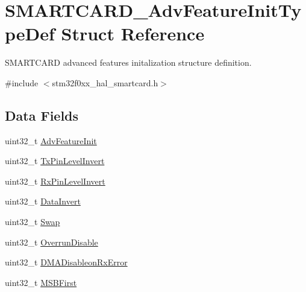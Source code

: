 \hypertarget{struct_s_m_a_r_t_c_a_r_d___adv_feature_init_type_def}{}\section{S\+M\+A\+R\+T\+C\+A\+R\+D\+\_\+\+Adv\+Feature\+Init\+Type\+Def Struct Reference}
\label{struct_s_m_a_r_t_c_a_r_d___adv_feature_init_type_def}


S\+M\+A\+R\+T\+C\+A\+RD advanced features initalization structure definition.  




{\ttfamily \#include $<$stm32f0xx\+\_\+hal\+\_\+smartcard.\+h$>$}

\subsection*{Data Fields}
\begin{DoxyCompactItemize}
\item 
uint32\+\_\+t \hyperlink{struct_s_m_a_r_t_c_a_r_d___adv_feature_init_type_def_ad3ebc9a49be4aa143250abfbe6c427d1}{Adv\+Feature\+Init}
\item 
uint32\+\_\+t \hyperlink{struct_s_m_a_r_t_c_a_r_d___adv_feature_init_type_def_a60e165495975a7d568a8ffad4e8d8d82}{Tx\+Pin\+Level\+Invert}
\item 
uint32\+\_\+t \hyperlink{struct_s_m_a_r_t_c_a_r_d___adv_feature_init_type_def_aac4de1a4e7a0036f074a66c3bdc81322}{Rx\+Pin\+Level\+Invert}
\item 
uint32\+\_\+t \hyperlink{struct_s_m_a_r_t_c_a_r_d___adv_feature_init_type_def_a1feb1398f541e95a819aea3aed2d7552}{Data\+Invert}
\item 
uint32\+\_\+t \hyperlink{struct_s_m_a_r_t_c_a_r_d___adv_feature_init_type_def_ac584fd738a8eca4af2f92cd10d593ab0}{Swap}
\item 
uint32\+\_\+t \hyperlink{struct_s_m_a_r_t_c_a_r_d___adv_feature_init_type_def_a482f50369e2e24a560b9fd8db7b23aae}{Overrun\+Disable}
\item 
uint32\+\_\+t \hyperlink{struct_s_m_a_r_t_c_a_r_d___adv_feature_init_type_def_a8ebe515413b9d135fc10d8b6d7a81ac9}{D\+M\+A\+Disableon\+Rx\+Error}
\item 
uint32\+\_\+t \hyperlink{struct_s_m_a_r_t_c_a_r_d___adv_feature_init_type_def_a4533506da01ae4e82bf4dd7211fb1c45}{M\+S\+B\+First}
\end{DoxyCompactItemize}


